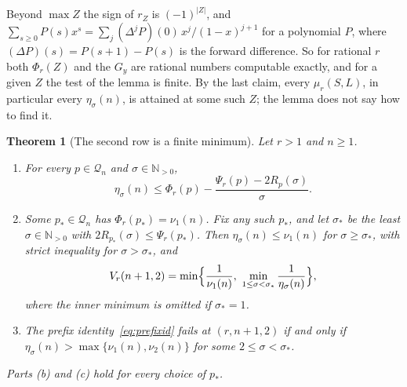 \documentclass[11pt]{article}
\newtheorem{theorem}{Theorem}[section]
\newcommand{\N}{\mathbb N}
\begin{document}
Beyond $\max Z$ the sign of $r_Z$ is $(-1)^{|Z|}$, and
$\sum_{s\ge0}P(s)x^s=\sum_j(\Delta^jP)(0)\,x^j/(1-x)^{j+1}$ for a
polynomial $P$, where $(\Delta P)(s)=P(s+1)-P(s)$ is the forward
difference.  So for rational $r$ both $\Phi_r(Z)$ and the $G_y$ are
rational numbers computable exactly, and for a given $Z$ the test of the
lemma is finite.  By the last claim, every $\mu_r(S,L)$, in particular every
$\eta_\sigma(n)$, is attained at some such $Z$; the lemma does not say how
to find it.


\begin{theorem}[The second row is a finite minimum]\label{thm:secondrow}
Let $r>1$ and $n\ge1$.
\begin{enumerate}
\item[(a)] For every $p\in\mathcal Q_n$ and $\sigma\in\N_{>0}$,
\[
  \eta_\sigma(n)\le\Phi_r(p)-\frac{\Psi_r(p)-2R_p(\sigma)}\sigma .
\]
\item[(b)] Some $p_*\in\mathcal Q_n$ has $\Phi_r(p_*)=\nu_1(n)$.  Fix any
such $p_*$, and let $\sigma_*$ be the least $\sigma\in\N_{>0}$ with
$2R_{p_*}(\sigma)\le\Psi_r(p_*)$.  Then $\eta_\sigma(n)\le\nu_1(n)$ for
$\sigma\ge\sigma_*$, with strict
inequality for $\sigma>\sigma_*$, and
\[
  V_r(n+1,2)=\min\Bigl\{\frac1{\nu_1(n)},\
  \min_{1\le\sigma<\sigma_*}\frac1{\eta_\sigma(n)}\Bigr\},
\]
where the inner minimum is omitted if $\sigma_*=1$.
\item[(c)] The prefix identity~\eqref{eq:prefixid} fails at $(r,n+1,2)$
if and only if $\eta_\sigma(n)>\max\{\nu_1(n),\nu_2(n)\}$ for some
$2\le\sigma<\sigma_*$.
\end{enumerate}
Parts (b) and (c) hold for every choice of $p_*$.
\end{theorem}
\end{document}
